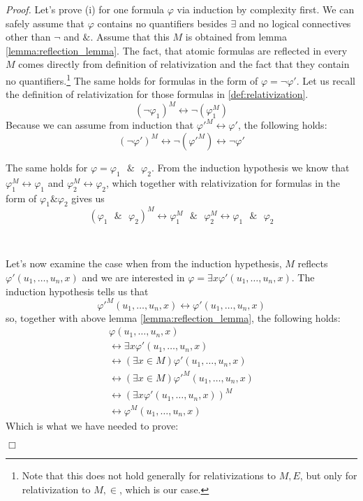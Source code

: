\documentclass[12pt,a4paper]{article}
\newenvironment{proof}
{\noindent \textit{Proof.}}
{\hspace*{\fill} $\Box$}
\renewcommand{\iff}{\leftrightarrow}
\begin{document}
\begin{proof}
Let's prove (i) for one formula $\varphi$ via induction by complexity first. We can safely assume that $\varphi$ contains no quantifiers besides $\exists$ and no logical connectives other than $\neg$ and $\&$.
Assume that this $M$ is obtained from lemma \ref{lemma:reflection_lemma}. The fact, that atomic formulas are reflected in every $M$ comes directly from definition of relativization and the fact that they contain no quantifiers.\footnote{Note that this does not hold generally for relativizations to $M, E$, but only for relativization to $M, \in$, which is our case.}
The same holds for formulas in the form of $\varphi = \neg \varphi'$. Let us recall the definition of relativization for those formulas in \ref{def:relativization}.
\begin{equation}
(\neg \varphi_1)^M \iff \neg (\varphi_1^M)
\end{equation}
Because we can assume from induction that $\varphi'^M \iff \varphi'$, the following holds:
\begin{equation}
(\neg \varphi')^M \iff \neg (\varphi'^M) \iff \neg \varphi'
\end{equation}

The same holds for $\varphi = \varphi_1\mbox{ }\&\mbox{ }\varphi_2$. From the induction hypothesis we know that $\varphi_1^M \iff \varphi_1$ and $\varphi_2^M \iff \varphi_2$, which together with relativization for formulas in the form of $\varphi_1 \& \varphi_2$ gives us
\begin{equation}
(\varphi_1\mbox{ }\&\mbox{ }\varphi_2)^M \iff \varphi_1^M\mbox{ }\&\mbox{ }\varphi_2^M \iff \varphi_1\mbox{ }\&\mbox{ }\varphi_2
\end{equation}

\

Let's now examine the case when from the induction hypethesis, $M$ reflects $\varphi'(u_1, \ldots, u_n, x)$ and we are interested in $\varphi = \exists x \varphi'(u_1, \ldots, u_n, x)$.
The induction hypothesis tells us that 
\begin{equation}
\varphi'^M(u_1, \ldots, u_n, x) \iff \varphi'(u_1, \ldots, u_n, x)
\end{equation}
so, together with above lemma \ref{lemma:reflection_lemma}, the following holds:
\begin{equation}
\begin{split}
\varphi(u_1, \ldots, u_n, x) \\
\iff \exists x \varphi'(u_1, \ldots, u_n, x) \\
\iff (\exists x \in M) \varphi'(u_1, \ldots, u_n, x) \\
\iff (\exists x \in M) \varphi'^M (u_1, \ldots, u_n, x) \\
\iff (\exists x \varphi'(u_1, \ldots, u_n, x))^M \\
\iff \varphi^M(u_1, \ldots, u_n, x)
\end{split}
\end{equation}
Which is what we have needed to prove:


\end{proof}
\end{document}
